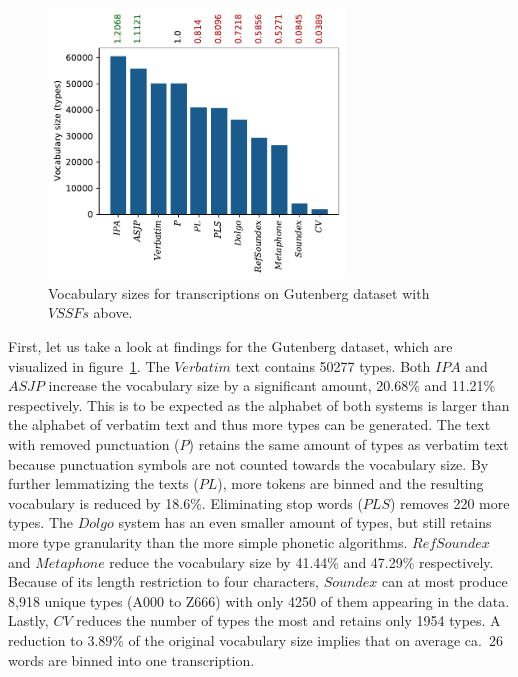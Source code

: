 \begin{figure}
  \centering
  \includegraphics[width=0.7\textwidth]{figures/vocab_sizes_2021-07-28_14-42-08_gb_pt}
  \caption{Vocabulary sizes for transcriptions on Gutenberg dataset with $VSSFs$ above.}
  \label{fig:vssf_transcriptions_gb}
\end{figure}
First, let us take a look at findings for the Gutenberg dataset, which are visualized in figure~\ref{fig:vssf_transcriptions_gb}.
The $Verbatim$ text contains 50277 types.
Both $IPA$ and $ASJP$ increase the vocabulary size by a significant amount, 20.68\% and 11.21\% respectively.
This is to be expected as the alphabet of both systems is larger than the alphabet of verbatim text and thus more types can be generated.
The text with removed punctuation ($P$) retains the same amount of types as verbatim text because punctuation symbols are not counted towards the vocabulary size.
By further lemmatizing the texts ($PL$), more tokens are binned and the resulting vocabulary is reduced by 18.6\%.
Eliminating stop words ($PLS$) removes 220 more types.
The $Dolgo$ system has an even smaller amount of types, but still retains more type granularity than the more simple phonetic algorithms.
$RefSoundex$ and $Metaphone$ reduce the vocabulary size by 41.44\% and 47.29\% respectively.
Because of its length restriction to four characters, $Soundex$ can at most produce 8,918 unique types (A000 to Z666) with only 4250 of them appearing in the data.
Lastly, $CV$ reduces the number of types the most and retains only 1954 types.
A reduction to 3.89\% of the original vocabulary size implies that on average ca.\ 26 words are binned into one transcription.\\
